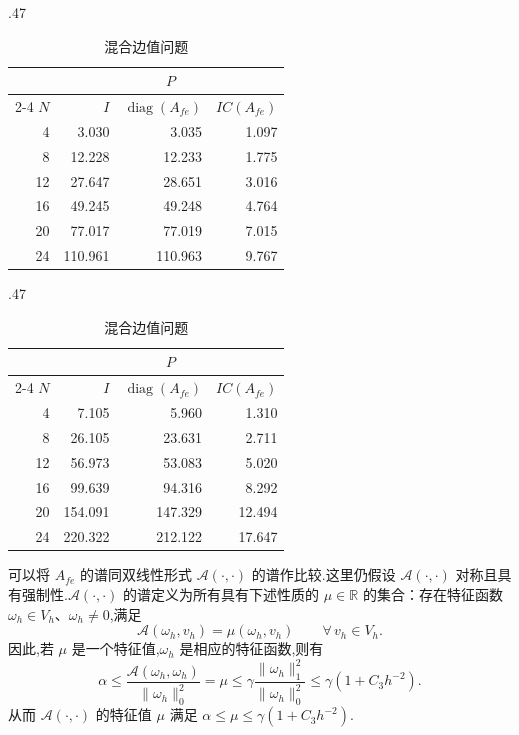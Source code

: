 \begin{table}[!htbp]
  \centering
  \caption{两种边值问题的谱条件数 \(\chi_{sp}(P^{-1}A_{fe})\)}\label{tab:6.3.1}
  \begin{subtable}[t]{.47\textwidth}
  \centering
  \caption{Dirichlet 边值问题}\label{tab:6.3.1a}
  \begin{tabular}{rrrr}
    \toprule
      & \multicolumn{3}{c}{\(P\)}\\
    \cmidrule(lr){2-4}
    \(N\)&\(I\)&\(\operatorname{diag}(A_{fe})\)&\(IC(A_{fe})\)\\
    \midrule
     4 & 3.030 & 3.035 & 1.097\\
     8 & 12.228 & 12.233 & 1.775\\
    12 & 27.647 & 28.651 & 3.016\\
    16 & 49.245 & 49.248 & 4.764\\
    20 & 77.017 & 77.019 & 7.015\\
    24 & 110.961 & 110.963 & 9.767\\
    \bottomrule
  \end{tabular}
  \end{subtable}\hfill
  \begin{subtable}[t]{.47\textwidth}
  \centering
  \caption{混合边值问题}\label{tab:6.3.1b}
  \begin{tabular}{rrrr}
    \toprule
      & \multicolumn{3}{c}{\(P\)}\\
    \cmidrule(lr){2-4}
    \(N\)&\(I\)&\(\operatorname{diag}(A_{fe})\)&\(IC(A_{fe})\)\\
    \midrule
     4 & 7.105 & 5.960 & 1.310\\
     8 & 26.105 & 23.631 & 2.711\\
    12 & 56.973 & 53.083 & 5.020\\
    16 & 99.639 & 94.316 & 8.292\\
    20 & 154.091 & 147.329 & 12.494\\
    24 & 220.322 & 212.122 & 17.647\\
    \bottomrule
  \end{tabular}
  \end{subtable}
\end{table}

可以将 \(A_{fe}\) 的谱同双线性形式 \(\mathcal A(\cdot,\cdot)\) 的谱作比较.这里仍假设 \(\mathcal A(\cdot,\cdot)\) 对称且具有强制性.\(\mathcal A(\cdot,\cdot)\) 的谱定义为所有具有下述性质的 \(\mu\in\mathbb R\) 的集合：存在特征函数 \(\omega_h\in V_h\)、\(\omega_h\ne0\),满足
\[
  \mathcal A(\omega_h,v_h)=\mu(\omega_h,v_h)\qquad\forall\, v_h\in V_h.
\]
因此,若 \(\mu\) 是一个特征值,\(\omega_h\) 是相应的特征函数,则有
\begin{equation}\label{eq:6.3.24}
  \alpha\le\frac{\mathcal A(\omega_h,\omega_h)}{\|\omega_h\|_0^2}
    =\mu\le\gamma\frac{\|\omega_h\|_1^2}{\|\omega_h\|_0^2}\le\gamma(1+C_3h^{-2}).
\end{equation}
从而 \(\mathcal A(\cdot,\cdot)\) 的特征值 \(\mu\) 满足 \(\alpha\le\mu\le\gamma(1+C_3h^{-2})\).

